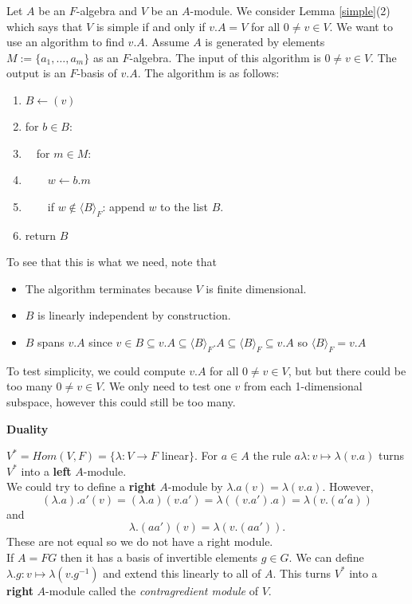 \documentclass[12pt]{amsart}
\theoremstyle{definition}
\begin{document}
Let $A$ be an $F$-algebra and $V$ be an $A$-module.  We consider Lemma \ref{simple}(2) which says that $V$ is simple if and only if $v.A=V$ for all $0\neq v\in V$. We want to use an algorithm to find $v.A$.  Assume $A$ is generated by elements $M:=\{a_1,\ldots,a_m\}$ as an $F$-algebra.  The input of this algorithm is $0\neq v\in V$.  The output is an $F$-basis of $v.A$.  The algorithm is as follows:
\begin{enumerate}
\item $B\leftarrow (v)$
\item for $b\in B$:
\item \ \ for $m\in M$:
\item \ \ \ \ $w\leftarrow b.m$
\item \ \ \ \ if $w\not\in\langle B\rangle_F$: append $w$ to the list $B$.
\item return $B$
\end{enumerate}

To see that this is what we need, note that
\begin{itemize}
\item The algorithm terminates because $V$ is finite dimensional.
\item $B$ is linearly independent by construction.
\item $B$ spans $v.A$ since $v\in B\subseteq v.A\subseteq\langle B\rangle_F .A\subseteq\langle B\rangle_F\subseteq v.A$ so $\langle B\rangle_F=v.A$
\end{itemize}

To test simplicity, we could compute $v.A$ for all $0\neq v\in V$, but but there could be too many $0\neq v\in V$.  We only need to test one $v$ from each 1-dimensional subspace, however this could still be too many.

\begin{center}
\textbf{Duality}
\end{center}

$V^*=Hom(V,F)=\{\lambda:V\rightarrow F$ linear$\}$.  For $a\in A$ the rule $a\lambda:v\mapsto\lambda(v.a)$ turns $V^*$ into a \textbf{left} $A$-module.\\

We could try to define a \textbf{right} $A$-module by $\lambda.a(v)=\lambda(v.a)$.  However,
$$(\lambda.a).a'(v)=(\lambda.a)(v.a')=\lambda((v.a').a)=\lambda(v.(a'a))$$
and
$$\lambda.(aa')(v)=\lambda(v.(aa')).$$
These are not equal so we do not have a right module.\\

If $A=FG$ then it has a basis of invertible elements $g\in G$.  We can define $\lambda.g:v\mapsto\lambda(v.g^{-1})$ and extend this linearly to all of $A$.  This turns $V^*$ into a \textbf{right} $A$-module called the \emph{contragredient module} of $V$.
\end{document}
